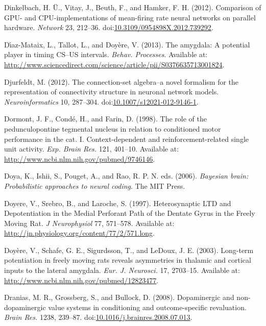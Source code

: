 \documentclass[
  11pt,
  a4paper,
]{scrbook}
\newlength{\cslhangindent}
\newenvironment{CSLReferences}[2] %
 {\begin{list}{}{%
  \setlength{\itemindent}{0pt}
  \setlength{\leftmargin}{0pt}
  \setlength{\parsep}{0pt}
  \ifodd #1
   \setlength{\leftmargin}{\cslhangindent}
   \setlength{\itemindent}{-1\cslhangindent}
  \fi
  \setlength{\itemsep}{#2\baselineskip}}}
 {\end{list}}
\begin{document}
\begin{CSLReferences}{1}{1}
Dinkelbach, H. Ü., Vitay, J., Beuth, F., and Hamker, F. H. (2012).
{Comparison of GPU- and CPU-implementations of mean-firing rate neural
networks on parallel hardware.} \emph{Network} 23, 212--36.
doi:\href{https://doi.org/10.3109/0954898X.2012.739292}{10.3109/0954898X.2012.739292}.

Dı́az-Mataix, L., Tallot, L., and Doyère, V. (2013). {The amygdala: A
potential player in timing CS--US intervals}. \emph{Behav. Processes}.
Available at:
\url{http://www.sciencedirect.com/science/article/pii/S0376635713001824}.

Djurfeldt, M. (2012). {The connection-set algebra--a novel formalism for
the representation of connectivity structure in neuronal network
models.} \emph{Neuroinformatics} 10, 287--304.
doi:\href{https://doi.org/10.1007/s12021-012-9146-1}{10.1007/s12021-012-9146-1}.

Dormont, J. F., Condé, H., and Farin, D. (1998). {The role of the
pedunculopontine tegmental nucleus in relation to conditioned motor
performance in the cat. I. Context-dependent and reinforcement-related
single unit activity.} \emph{Exp. Brain Res.} 121, 401--10. Available
at: \url{http://www.ncbi.nlm.nih.gov/pubmed/9746146}.

Doya, K., Ishii, S., Pouget, A., and Rao, R. P. N. eds. (2006).
\emph{Bayesian brain: Probabilistic approaches to neural coding}. The
MIT Press.

Doyere, V., Srebro, B., and Laroche, S. (1997). {Heterosynaptic LTD and
Depotentiation in the Medial Perforant Path of the Dentate Gyrus in the
Freely Moving Rat}. \emph{J Neurophysiol} 77, 571--578. Available at:
\url{http://jn.physiology.org/content/77/2/571.long}.

Doyère, V., Schafe, G. E., Sigurdsson, T., and LeDoux, J. E. (2003).
{Long-term potentiation in freely moving rats reveals asymmetries in
thalamic and cortical inputs to the lateral amygdala.} \emph{Eur. J.
Neurosci.} 17, 2703--15. Available at:
\url{http://www.ncbi.nlm.nih.gov/pubmed/12823477}.

Dranias, M. R., Grossberg, S., and Bullock, D. (2008). {Dopaminergic and
non-dopaminergic value systems in conditioning and outcome-specific
revaluation.} \emph{Brain Res.} 1238, 239--87.
doi:\href{https://doi.org/10.1016/j.brainres.2008.07.013}{10.1016/j.brainres.2008.07.013}.


\end{CSLReferences}
\end{document}
